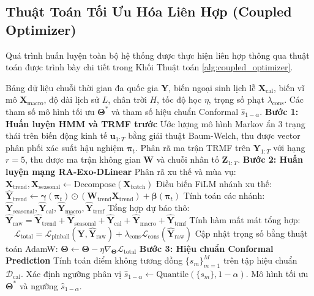 \subsection{Thuật Toán Tối Ưu Hóa Liên Hợp (Coupled Optimizer)}
\label{subsec:coupled_optimizer}
Quá trình huấn luyện toàn bộ hệ thống được thực hiện liên hợp thông qua thuật toán được trình bày chi tiết trong Khối Thuật toán \ref{alg:coupled_optimizer}.

\begin{algorithm}[H]
\caption{Thuật toán huấn luyện liên hợp RA-HE-DLinear (Coupled Optimizer)}
\label{alg:coupled_optimizer}
\begin{algorithmic}[1]
\REQUIRE Bảng dữ liệu chuỗi thời gian đa quốc gia $\mathbf{Y}$, biến ngoại sinh lịch lễ $\mathbf{X}_{\text{cal}}$, biến vĩ mô $\mathbf{X}_{\text{macro}}$, độ dài lịch sử $L$, chân trời $H$, tốc độ học $\eta$, trọng số phạt $\lambda_{\text{cons}}$.
\ENSURE Các tham số mô hình tối ưu $\bm{\Theta}^*$ và tham số hiệu chuẩn Conformal $\hat{s}_{1-\alpha}$.
\STATE \textbf{Bước 1: Huấn luyện HMM và TRMF trước}
\STATE Ước lượng mô hình Markov ẩn 3 trạng thái trên biến động kinh tế $\mathbf{u}_{1:T}$ bằng giải thuật Baum-Welch, thu được vector phân phối xác suất hậu nghiệm $\bm{\pi}_t$.
\STATE Phân rã ma trận TRMF trên $\mathbf{Y}_{1:T}$ với hạng $r=5$, thu được ma trận không gian $\mathbf{W}$ và chuỗi nhân tố $\mathbf{Z}_{1:T}$.
\STATE \textbf{Bước 2: Huấn luyện mạng RA-Exo-DLinear}
        \STATE Phân rã xu thế và mùa vụ: $\mathbf{X}_{\text{trend}}, \mathbf{X}_{\text{seasonal}} \leftarrow \text{Decompose}(\mathbf{X}_{\text{batch}})$
        \STATE Điều biến FiLM nhánh xu thế: $\hat{\mathbf{Y}}_{\text{trend}} \leftarrow \bm{\gamma}(\bm{\pi}_t) \odot (\mathbf{W}_{\text{trend}} \mathbf{X}_{\text{trend}}) + \bm{\beta}(\bm{\pi}_t)$
        \STATE Tính toán các nhánh: $\hat{\mathbf{Y}}_{\text{seasonal}}, \hat{\mathbf{Y}}_{\text{cal}}, \hat{\mathbf{Y}}_{\text{macro}}, \hat{\mathbf{Y}}_{\text{trmf}}$
        \STATE Tổng hợp dự báo thô: $\hat{\mathbf{Y}}_{\text{raw}} = \hat{\mathbf{Y}}_{\text{trend}} + \hat{\mathbf{Y}}_{\text{seasonal}} + \hat{\mathbf{Y}}_{\text{cal}} + \hat{\mathbf{Y}}_{\text{macro}} + \hat{\mathbf{Y}}_{\text{trmf}}$
        \STATE Tính hàm mất mát tổng hợp:
        \STATE $\quad \mathcal{L}_{\text{total}} = \mathcal{L}_{\text{pinball}}(\mathbf{Y}, \hat{\mathbf{Y}}_{\text{raw}}) + \lambda_{\text{cons}} \mathcal{L}_{\text{cons}}(\hat{\mathbf{Y}}_{\text{raw}})$
        \STATE Cập nhật trọng số bằng thuật toán AdamW: $\bm{\Theta} \leftarrow \bm{\Theta} - \eta \nabla_{\bm{\Theta}} \mathcal{L}_{\text{total}}$
    \ENDFOR
\ENDFOR
\STATE \textbf{Bước 3: Hiệu chuẩn Conformal Prediction}
\STATE Tính toán điểm không tương đồng $\{s_m\}_{m=1}^M$ trên tập hiệu chuẩn $\mathcal{D}_{\text{cal}}$.
\STATE Xác định ngưỡng phân vị $\hat{s}_{1-\alpha} \leftarrow \text{Quantile}(\{s_m\}, 1 - \alpha)$.
\RETURN Mô hình tối ưu $\bm{\Theta}^*$ và ngưỡng $\hat{s}_{1-\alpha}$.
\end{algorithmic}
\end{algorithm}
